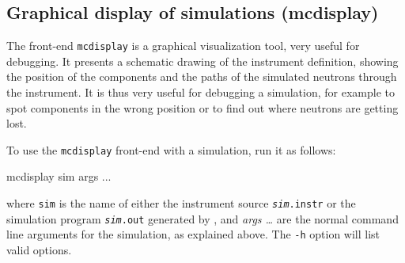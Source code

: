 \subsection{Graphical display of simulations (mcdisplay)}
\label{s:mcdisplay}

The front-end \verb+mcdisplay+ is a graphical
visualization tool, very useful for debugging.  It presents a schematic drawing
of the instrument definition, showing the position of the components and the
paths of the simulated neutrons through the instrument. It is thus very useful
for debugging a simulation, for example to spot components in the wrong position
or to find out where neutrons are getting lost.

To use the \verb+mcdisplay+ front-end with a simulation, run it as
follows:
\begin{bash}
mcdisplay sim args ...
\end{bash}

where \verb+sim+ is the name of either the instrument source
\texttt{\textit{sim}.instr} or the simulation program \texttt{\textit{sim}.out} generated by \mcs,
and \textit{args \ldots} are the normal command line arguments for the
simulation, as explained above. The \verb+-h+ option will list valid options.

